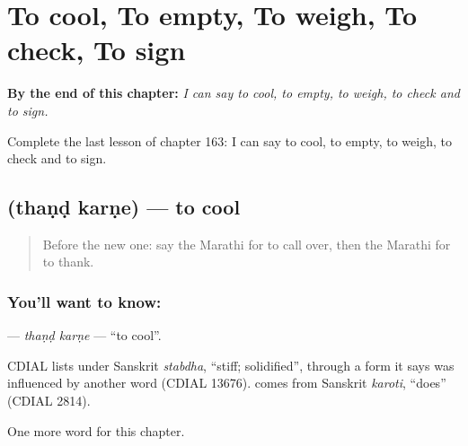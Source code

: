 
\chapter{To cool, To empty, To weigh, To check, To sign}
\label{ch:mr-to-cool-to-empty-to-weigh-to-check-to-sign}

\begin{chapteropening}
\textbf{By the end of this chapter:} \emph{I can say to cool, to empty, to weigh, to check and to sign.}

Complete the last lesson of chapter 163: I can say to cool, to empty, to weigh, to check and to sign.
\end{chapteropening}

\section[\texorpdfstring{\mr{थंड} \mr{करणे} (thaṇḍ karṇe)}{थंड करणे (thaṇḍ karṇe)}]{  (thaṇḍ karṇe) — to cool}

\label{lesson:MR-C163-thand-karne}



\begin{quote}
Before the new one: say the Marathi for to call over, then the Marathi for to thank.
\end{quote}

\subsection*{You'll want to know:  }
\textbf{ } — \emph{thaṇḍ karṇe} — \textquotedblleft{}to cool\textquotedblright{}.

\begin{cousinweb}
\textbf{} CDIAL lists under Sanskrit \emph{stabdha}, \textquotedblleft{}stiff; solidified\textquotedblright{}, through a form it says was influenced by another word (CDIAL 13676). \textbf{} comes from Sanskrit \emph{karoti}, \textquotedblleft{}does\textquotedblright{} (CDIAL 2814).
\end{cousinweb}

\begin{grammarlens}[title={What you've built}]
One more word for this chapter.
\end{grammarlens}

